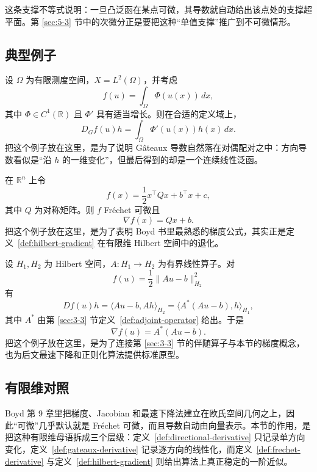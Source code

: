 \begin{remark}
这条支撑不等式说明：一旦凸泛函在某点可微，其导数就自动给出该点处的支撑超平面。第 \ref{sec:5-3} 节中的次微分正是要把这种“单值支撑”推广到不可微情形。
\end{remark}

\subsection{典型例子}

\begin{example}\label{ex:gateaux-integral-functional}
设 $\Omega$ 为有限测度空间，$X=L^2(\Omega)$，并考虑
\[
f(u)=\int_\Omega \Phi(u(x))\,dx,
\]
其中 $\Phi\in C^1(\mathbb R)$ 且 $\Phi'$ 具有适当增长。则在合适的定义域上，
\[
D_G f(u)h=\int_\Omega \Phi'(u(x))h(x)\,dx.
\]
把这个例子放在这里，是为了说明 Gâteaux 导数自然落在对偶配对之中：方向导数看似是“沿 $h$ 的一维变化”，但最后得到的却是一个连续线性泛函。
\end{example}

\begin{example}[欧氏二次型的梯度]\label{ex:quadratic-gradient}
在 $\mathbb R^n$ 上令
\[
f(x)=\frac12 x^\top Qx+b^\top x+c,
\]
其中 $Q$ 为对称矩阵。则 $f$ Fréchet 可微且
\[
\nabla f(x)=Qx+b.
\]
把这个例子放在这里，是为了表明 Boyd 书里最熟悉的梯度公式，其实正是定义~\ref{def:hilbert-gradient} 在有限维 Hilbert 空间中的退化。
\end{example}

\begin{example}\label{ex:hilbert-least-squares}
设 $H_1,H_2$ 为 Hilbert 空间，$A\colon H_1\to H_2$ 为有界线性算子。对
\[
f(u)=\frac12\|Au-b\|_{H_2}^2
\]
有
\[
Df(u)h=\langle Au-b,Ah\rangle_{H_2}
=\langle A^\ast(Au-b),h\rangle_{H_1},
\]
其中 $A^\ast$ 由第 \ref{sec:3-3} 节定义~\ref{def:adjoint-operator} 给出。于是
\[
\nabla f(u)=A^\ast(Au-b).
\]
把这个例子放在这里，是为了连接第 \ref{sec:3-3} 节的伴随算子与本节的梯度概念，也为后文最速下降和正则化算法提供标准原型。
\end{example}

\subsection*{有限维对照}

Boyd 第 9 章里把梯度、Jacobian 和最速下降法建立在欧氏空间几何之上，因此“可微”几乎默认就是 Fréchet 可微，而且导数自动由向量表示。本节的作用，是把这种有限维母语拆成三个层级：定义~\ref{def:directional-derivative} 只记录单方向变化，定义~\ref{def:gateaux-derivative} 记录逐方向的线性化，而定义~\ref{def:frechet-derivative} 与定义~\ref{def:hilbert-gradient} 则给出算法上真正稳定的一阶近似。

